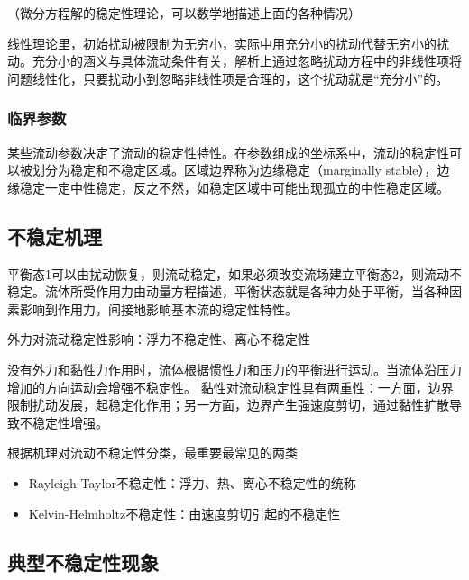 （微分方程解的稳定性理论，可以数学地描述上面的各种情况）

线性理论里，初始扰动被限制为无穷小，实际中用充分小的扰动代替无穷小的扰动。充分小的涵义与具体流动条件有关，解析上通过忽略扰动方程中的非线性项将问题线性化，只要扰动小到忽略非线性项是合理的，这个扰动就是“充分小”的。

\subsubsection{临界参数}
某些流动参数决定了流动的稳定性特性。在参数组成的坐标系中，流动的稳定性可以被划分为稳定和不稳定区域。区域边界称为边缘稳定（marginally stable），边缘稳定一定中性稳定，反之不然，如稳定区域中可能出现孤立的中性稳定区域。

\subsection{不稳定机理}
平衡态1可以由扰动恢复，则流动稳定，如果必须改变流场建立平衡态2，则流动不稳定。流体所受作用力由动量方程描述，平衡状态就是各种力处于平衡，当各种因素影响到作用力，间接地影响基本流的稳定性特性。

外力对流动稳定性影响：浮力不稳定性、离心不稳定性

没有外力和黏性力作用时，流体根据惯性力和压力的平衡进行运动。当流体沿压力增加的方向运动会增强不稳定性。
黏性对流动稳定性具有两重性：一方面，边界限制扰动发展，起稳定化作用；另一方面，边界产生强速度剪切，通过黏性扩散导致不稳定性增强。

根据机理对流动不稳定性分类，最重要最常见的两类
\begin{itemize}
    \item Rayleigh-Taylor不稳定性：浮力、热、离心不稳定性的统称
    \item Kelvin-Helmholtz不稳定性：由速度剪切引起的不稳定性
\end{itemize}

\subsection{典型不稳定性现象}

